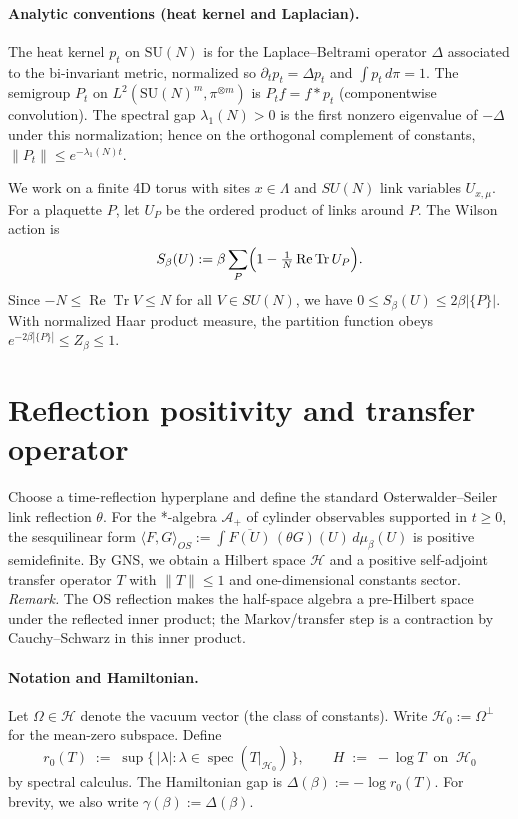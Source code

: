 \documentclass[11pt]{amsart}
\theoremstyle{plain}
\theoremstyle{definition}
\theoremstyle{remark}
\begin{document}
\paragraph{Analytic conventions (heat kernel and Laplacian).}
The heat kernel $p_t$ on $\mathrm{SU}(N)$ is for the Laplace--Beltrami operator $\Delta$ associated to the bi-invariant metric, normalized so $\partial_t p_t = \Delta p_t$ and $\int p_t\,d\pi=1$. The semigroup $P_t$ on $L^2(\mathrm{SU}(N)^m,\pi^{\otimes m})$ is $P_t f = f* p_t$ (componentwise convolution). The spectral gap $\lambda_1(N)>0$ is the first nonzero eigenvalue of $-\Delta$ under this normalization; hence on the orthogonal complement of constants, $\|P_t\| \le e^{-\lambda_1(N) t}$.

We work on a finite 4D torus with sites $x\in\Lambda$ and $SU(N)$ link variables $U_{x,\mu}$. For a plaquette $P$, let $U_P$ be the ordered product of links around $P$. The Wilson action is
\[
 S_{\beta}(U) := \beta \sum_{P} \Bigl(1 - \tfrac{1}{N} \operatorname{Re} \operatorname{Tr} U_P\Bigr).
\]
Since $-N\le \operatorname{Re} \operatorname{Tr} V \le N$ for all $V\in SU(N)$, we have $0\le S_{\beta}(U)\le 2\beta |\{P\}|$. With normalized Haar product measure, the partition function obeys $e^{-2\beta |\{P\}|}\le Z_{\beta}\le 1$.
\section{Reflection positivity and transfer operator}

Choose a time-reflection hyperplane and define the standard Osterwalder--Seiler link reflection $\theta$. For the *-algebra $\mathcal A_+$ of cylinder observables supported in $t\ge 0$, the sesquilinear form $\langle F,G\rangle_{OS}:=\int \overline{F(U)}\,(\theta G)(U)\, d\mu_{\beta}(U)$ is positive semidefinite. By GNS, we obtain a Hilbert space $\mathcal H$ and a positive self-adjoint transfer operator $T$ with $\lVert T\rVert\le 1$ and one-dimensional constants sector.
\smallskip
\noindent\emph{Remark.} The OS reflection makes the half-space algebra a pre-Hilbert space under the reflected inner product; the Markov/transfer step is a contraction by Cauchy–Schwarz in this inner product.

\paragraph{Notation and Hamiltonian.}
Let $\Omega\in\mathcal H$ denote the vacuum vector (the class of constants). Write $\mathcal H_0:=\Omega^{\perp}$ for the mean-zero subspace. Define
\[
  r_0(T)\;:=\; \sup\{\,|\lambda| : \lambda\in\operatorname{spec}(T|_{\mathcal H_0})\,\},\qquad
  H\;:=\;-\log T\ \text{ on }\ \mathcal H_0
\]
by spectral calculus. The Hamiltonian gap is $\Delta(\beta):=-\log r_0(T)$.
For brevity, we also write $\gamma(\beta):=\Delta(\beta)$.
\end{document}
